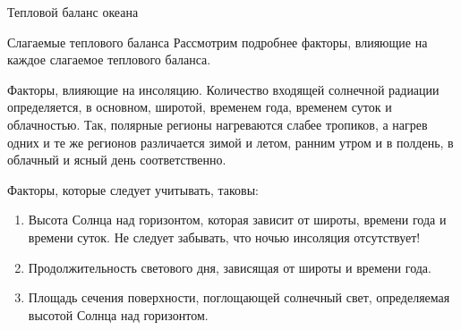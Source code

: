 \begin{chapter}{Тепловой баланс океана}
\begin{section}{Слагаемые теплового баланса}
Рассмотрим подробнее факторы, влияющие на каждое слагаемое теплового баланса.
%

\begin{paragraph}{Факторы, влияющие на инсоляцию.}
Количество входящей солнечной радиации определяется, в основном, широтой,
временем года, временем суток и облачностью. Так, полярные регионы нагреваются
слабее тропиков, а нагрев одних и те же регионов различается зимой и летом,
ранним утром и в полдень, в облачный и ясный день соответственно.
%

Факторы, которые следует учитывать, таковы:
%
\begin{enumerate}
\item
Высота Солнца над горизонтом, которая зависит от широты, времени года 
и времени суток. Не следует забывать, что ночью инсоляция отсутствует!
%

\item
Продолжительность светового дня, зависящая от широты и времени года.
%

\item
Площадь сечения поверхности, поглощающей солнечный свет, определяемая высотой
Солнца над горизонтом.
%


\end{enumerate}
\end{paragraph}
\end{section}
\end{chapter}

